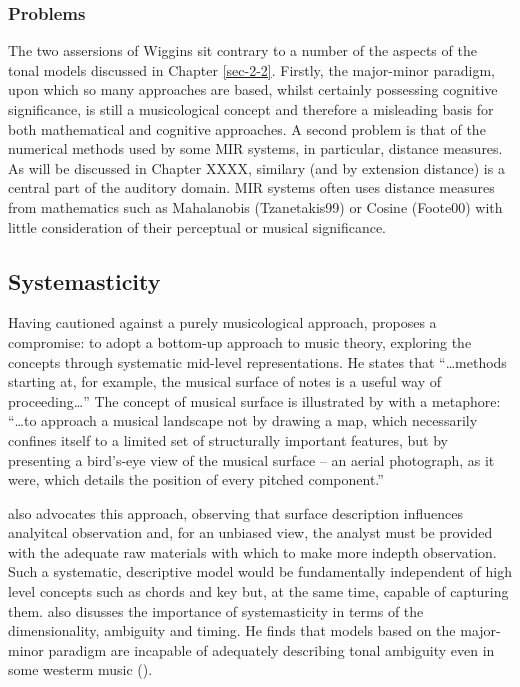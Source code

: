 \documentclass{article}
\begin{document}
\subsubsection{Problems}
\label{sec-2-3-3}

The two assersions of Wiggins sit contrary to a number of the aspects
of the tonal models discussed in Chapter \ref{sec-2-2}. Firstly,
the major-minor paradigm, upon which so many approaches are based,
whilst certainly possessing cognitive significance, is still a
musicological concept and therefore a misleading basis for both
mathematical and cognitive approaches. A second problem is that of the
numerical methods used by some MIR systems, in particular, distance
measures. As will be discussed in Chapter XXXX, similary (and by
extension distance) is a central part of the auditory domain. MIR
systems often uses distance measures from mathematics such as
Mahalanobis (Tzanetakis99) or Cosine (Foote00) with little
consideration of their perceptual or musical significance.
\subsection{Systemasticity}
\label{sec-2-4}

Having cautioned against a purely musicological approach,
\citep{Wiggins2009} proposes a compromise: to adopt a bottom-up
approach to music theory, exploring the concepts through systematic
mid-level representations. He states that ``\ldots{}methods starting at, for
example, the musical surface of notes is a useful way of
proceeding\ldots{}'' The concept of musical surface is illustrated by
\citet[pp. 159]{Huovinen2007} with a metaphore: ``\ldots{}to approach a
musical landscape not by drawing a map, which necessarily confines
itself to a limited set of structurally important features, but by
presenting a bird’s-eye view of the musical surface – an aerial
photograph, as it were, which details the position of every pitched
component.'' 

\citep{Martorell2013} also advocates this approach, observing that
surface description influences analyitcal observation and, for an
unbiased view, the analyst must be provided with the adequate raw
materials with which to make more indepth observation. Such a
systematic, descriptive model would be fundamentally independent of
high level concepts such as chords and key but, at the same time,
capable of capturing them. \citep{Martorell2013} also disusses the
importance of systemasticity in terms of the dimensionality, ambiguity
and timing. He finds that models based on the major-minor paradigm are
incapable of adequately describing tonal ambiguity even in some
westerm music (\citep[chap. 3]{Martorell2013}).
\end{document}
